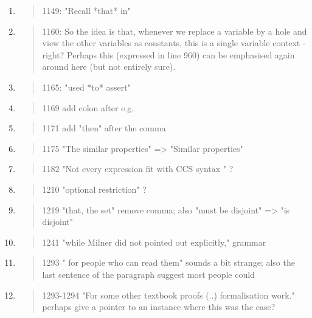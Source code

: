 \begin{enumerate}
  \item \begin{quote}
1149: "Recall *that* in"
\end{quote}
  \Mark

  \item \begin{quote}
1160: So the idea is that, whenever we replace a variable by a hole and view the other variables as constants, this is a single variable context - right? Perhaps this (expressed in line 960) can be emphasised again around here (but not entirely sure). 
\end{quote}
  \Mark

  \item \begin{quote}
1165: "used *to* assert"
\end{quote}
  \Mark

  \item \begin{quote}
1169 add colon after e.g.
\end{quote}
  \Mark

  \item \begin{quote}
1171 add "then" after the comma 
\end{quote}
  \Mark

  \item \begin{quote}
1175 "The similar properties" => "Similar properties"
\end{quote}
  \Mark

  \item \begin{quote}
1182 "Not every expression fit with CCS syntax " ?
\end{quote}
  \Mark

  \item \begin{quote}
1210 "optional restriction" ?
\end{quote}
  \Mark

  \item \begin{quote}
1219 "that, the set" remove comma; also "must be disjoint" => "is disjoint"
\end{quote}
  \Mark

  \item \begin{quote}
1241 "while Milner did not pointed out explicitly," grammar
\end{quote}
  \Mark

  \item \begin{quote}
1293 " for people who can read them" sounds a bit strange; also the last sentence of the paragraph suggest most people could
\end{quote}
  \Mark

  \item \begin{quote}
1293-1294 "For some other textbook proofs (..) formalisation work." perhaps give a pointer to an instance where this was the case?
\end{quote}
  \Mark

\end{enumerate}
